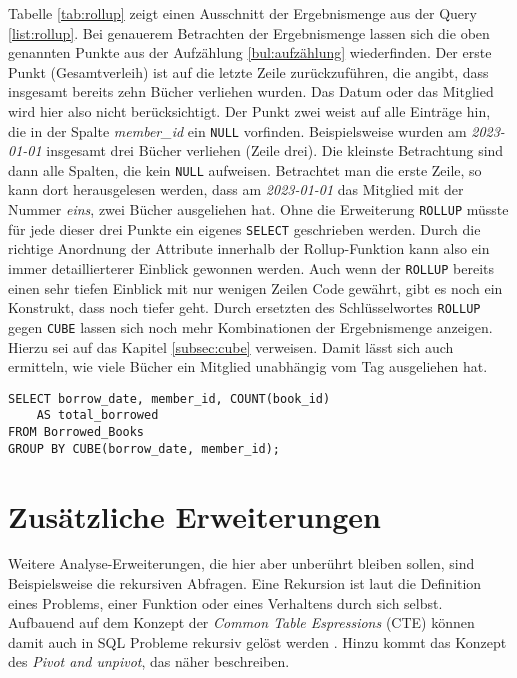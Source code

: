 Tabelle \ref{tab:rollup} zeigt einen Ausschnitt der Ergebnismenge aus der Query
\ref{list:rollup}. Bei genauerem Betrachten der Ergebnismenge lassen sich die oben
genannten Punkte aus der Aufzählung \ref{bul:aufzählung} wiederfinden. Der erste
Punkt (Gesamtverleih) ist auf die letzte Zeile zurückzuführen, die angibt, dass
insgesamt bereits zehn Bücher verliehen wurden. Das Datum oder das Mitglied wird
hier also nicht berücksichtigt. Der Punkt zwei weist auf alle Einträge hin, die in
der Spalte \textit{member\_id} ein \texttt{NULL} vorfinden. Beispielsweise
wurden am \textit{2023-01-01} insgesamt drei Bücher verliehen (Zeile drei). Die
kleinste Betrachtung sind dann alle Spalten, die kein \texttt{NULL} aufweisen. Betrachtet
man die erste Zeile, so kann dort herausgelesen werden, dass am \textit{2023-01-01}
das Mitglied mit der Nummer \textit{eins}, zwei Bücher ausgeliehen hat. Ohne die
Erweiterung \texttt{ROLLUP} müsste für jede dieser drei Punkte ein eigenes
\texttt{SELECT} geschrieben werden. Durch die richtige Anordnung der Attribute
innerhalb der Rollup-Funktion kann also ein immer detaillierterer Einblick
gewonnen werden. Auch wenn der \texttt{ROLLUP} bereits einen sehr tiefen
Einblick mit nur wenigen Zeilen Code gewährt, gibt es noch ein Konstrukt, dass
noch tiefer geht. Durch ersetzten des Schlüsselwortes \texttt{ROLLUP} gegen
\texttt{CUBE} lassen sich noch mehr Kombinationen der Ergebnismenge anzeigen.
Hierzu sei auf das Kapitel \ref{subsec:cube} verweisen. Damit lässt sich auch ermitteln,
wie viele Bücher ein Mitglied unabhängig vom Tag ausgeliehen hat.

\begin{lstlisting}
SELECT borrow_date, member_id, COUNT(book_id)
	AS total_borrowed
FROM Borrowed_Books
GROUP BY CUBE(borrow_date, member_id);
\end{lstlisting}

\section{Zusätzliche Erweiterungen}
\label{sec:zus_erweiterungen} Weitere Analyse-Erweiterungen, die hier aber
unberührt bleiben sollen, sind Beispielsweise die rekursiven Abfragen. Eine
Rekursion ist laut \citet{benecke1998rekursion} die Definition eines Problems,
einer Funktion oder eines Verhaltens durch sich selbst. Aufbauend auf dem Konzept
der \textit{Common Table Espressions} (CTE) können damit auch in SQL Probleme
rekursiv gelöst werden \citep{Ignacio2022}. Hinzu kommt das Konzept des \textit{Pivot
and unpivot}, das \citet{Nuijten2023} näher beschreiben.